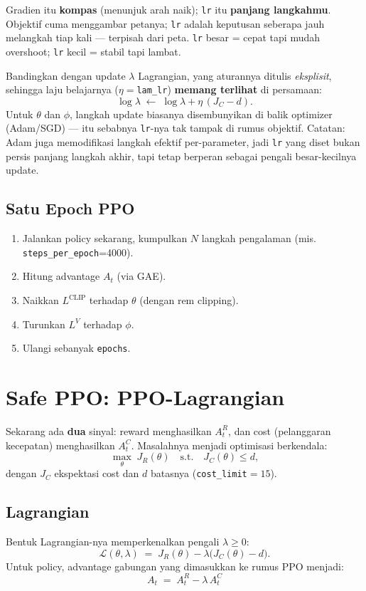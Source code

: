 \documentclass[11pt,a4paper]{article}
\begin{document}
\begin{intuisi}
Gradien itu \textbf{kompas} (menunjuk arah naik); \texttt{lr} itu \textbf{panjang langkahmu}.
Objektif cuma menggambar petanya; \texttt{lr} adalah keputusan seberapa jauh melangkah tiap
kali --- terpisah dari peta. \texttt{lr} besar = cepat tapi mudah overshoot; \texttt{lr}
kecil = stabil tapi lambat.
\end{intuisi}

Bandingkan dengan update $\lambda$ Lagrangian, yang aturannya ditulis \emph{eksplisit},
sehingga laju belajarnya ($\eta=$\texttt{lam\_lr}) \textbf{memang terlihat} di persamaan:
\[ \log\lambda \;\leftarrow\; \log\lambda + \eta\,(J_C - d). \]
Untuk $\theta$ dan $\phi$, langkah update biasanya disembunyikan di balik optimizer
(Adam/SGD) --- itu sebabnya \texttt{lr}-nya tak tampak di rumus objektif. Catatan: Adam
juga memodifikasi langkah efektif per-parameter, jadi \texttt{lr} yang diset bukan persis
panjang langkah akhir, tapi tetap berperan sebagai pengali besar-kecilnya update.

\subsection{Satu Epoch PPO}
\begin{enumerate}[nosep]
  \item Jalankan policy sekarang, kumpulkan $N$ langkah pengalaman (mis. \texttt{steps\_per\_epoch}=4000).
  \item Hitung advantage $A_t$ (via GAE).
  \item Naikkan $L^{\mathrm{CLIP}}$ terhadap $\theta$ (dengan rem clipping).
  \item Turunkan $L^{V}$ terhadap $\phi$.
  \item Ulangi sebanyak \texttt{epochs}.
\end{enumerate}

\section{Safe PPO: PPO-Lagrangian}
\label{sec:safe}
Sekarang ada \textbf{dua} sinyal: reward menghasilkan $A_t^{R}$, dan cost (pelanggaran
kecepatan) menghasilkan $A_t^{C}$. Masalahnya menjadi optimisasi berkendala:
\[ \max_\theta \; J_R(\theta) \quad \text{s.t.} \quad J_C(\theta) \le d, \]
dengan $J_C$ ekspektasi cost dan $d$ batasnya (\texttt{cost\_limit}$=15$).

\subsection{Lagrangian}
Bentuk Lagrangian-nya memperkenalkan pengali $\lambda \ge 0$:
\[ \mathcal{L}(\theta,\lambda) \;=\; J_R(\theta) - \lambda\big(J_C(\theta) - d\big). \]
Untuk policy, advantage gabungan yang dimasukkan ke rumus PPO menjadi:
\[ \boxed{\; A_t \;=\; A_t^{R} - \lambda\, A_t^{C} \;} \]
\end{document}
